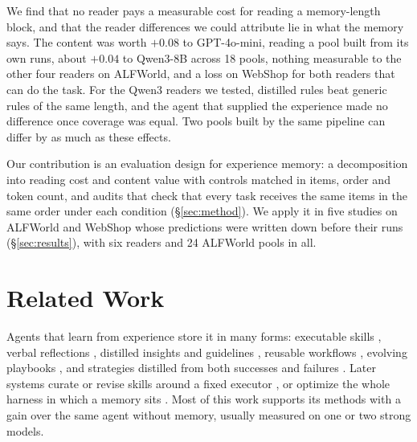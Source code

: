 We find that no reader pays a measurable cost for reading a memory-length block, and that the reader
differences we could attribute lie in what the memory says. The content was worth $+0.08$ to
GPT-4o-mini, reading a pool built from its own runs, about $+0.04$ to Qwen3-8B across 18 pools, nothing
measurable to the other four readers on ALFWorld, and a loss on WebShop for both readers that can do the
task. For the Qwen3 readers we tested, distilled rules beat generic rules of the same length, and the
agent that supplied the experience made no difference once coverage was equal. Two pools built by the
same pipeline can differ by as much as these effects.

Our contribution is an evaluation design for experience memory: a decomposition into reading cost and
content value with controls matched in items, order and token count, and audits that check that every
task receives the same items in the same order under each condition (\S\ref{sec:method}). We apply it in
five studies on ALFWorld \citep{shridhar2021alfworld} and WebShop \citep{yao2022webshop} whose
predictions were written down before their runs (\S\ref{sec:results}), with six readers and 24 ALFWorld
pools in all.

\section{Related Work}
\label{sec:related}

Agents that learn from experience store it in many forms: executable skills \citep{wang2024voyager},
verbal reflections \citep{shinn2023reflexion}, distilled insights and guidelines
\citep{zhao2023expel,fu2024autoguide}, reusable workflows \citep{wang2025awm}, evolving playbooks
\citep{zhang2026ace}, and strategies distilled from both successes and failures
\citep{ouyang2026reasoningbank}. Later systems curate or revise skills around a fixed executor
\citep{yang2026skillopt,ouyang2026skillos,gao2026selfevoskill}, or optimize the whole harness in which
a memory sits \citep{lee2026metaharness,huang2026memoharness}. Most of this work supports its methods
with a gain over the same agent without memory, usually measured on one or two strong models.

